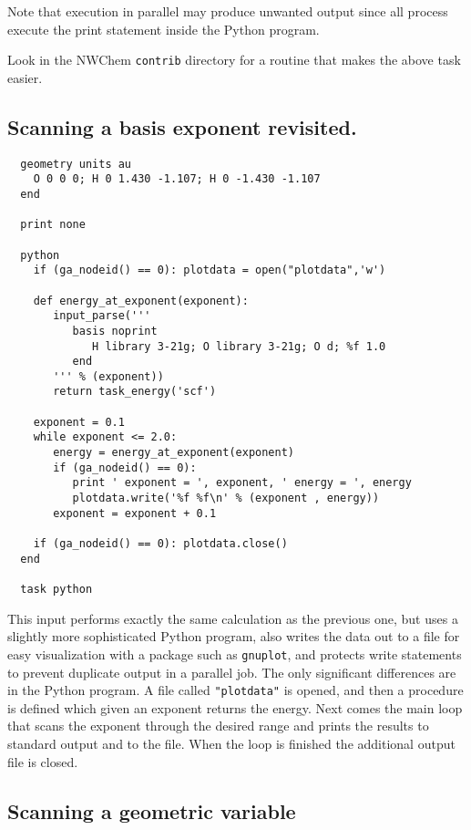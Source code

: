 Note that execution in parallel may produce unwanted output since
all process execute the print statement inside the Python program.

Look in the NWChem \verb+contrib+ directory for a routine that makes
the above task easier.

\subsection{Scanning a basis exponent revisited.}
\label{sec:scan2}

\begin{verbatim}
  geometry units au
    O 0 0 0; H 0 1.430 -1.107; H 0 -1.430 -1.107
  end

  print none

  python
    if (ga_nodeid() == 0): plotdata = open("plotdata",'w')

    def energy_at_exponent(exponent):
       input_parse('''
          basis noprint
             H library 3-21g; O library 3-21g; O d; %f 1.0
          end
       ''' % (exponent))
       return task_energy('scf')

    exponent = 0.1
    while exponent <= 2.0:
       energy = energy_at_exponent(exponent)
       if (ga_nodeid() == 0):
          print ' exponent = ', exponent, ' energy = ', energy
          plotdata.write('%f %f\n' % (exponent , energy))
       exponent = exponent + 0.1

    if (ga_nodeid() == 0): plotdata.close()
  end

  task python
\end{verbatim}

This input performs exactly the same calculation as the previous one,
but uses a slightly more sophisticated Python program, also writes
the data out to a file for easy visualization with a package such as
\verb+gnuplot+, and protects write statements to prevent 
duplicate output in a parallel job.  The only significant differences
are in the Python program.  A file called \verb+"plotdata"+ is opened,
and then a procedure is defined which given an exponent returns the
energy.  Next comes the main loop that scans the exponent through the
desired range and prints the results to standard output and to the
file.  When the loop is finished the additional output file is closed.

\subsection{Scanning a geometric variable}

